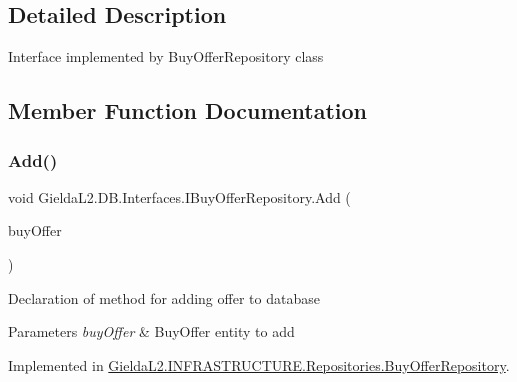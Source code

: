 \subsection{Detailed Description}
Interface implemented by Buy\+Offer\+Repository class 



\subsection{Member Function Documentation}
\mbox{\label{interface_gielda_l2_1_1_d_b_1_1_interfaces_1_1_i_buy_offer_repository_aae66f2818cb5476f701c68266e413d87}} 
\subsubsection{\texorpdfstring{Add()}{Add()}}
{\footnotesize\ttfamily void Gielda\+L2.\+D\+B.\+Interfaces.\+I\+Buy\+Offer\+Repository.\+Add (\begin{DoxyParamCaption}\item[{\mbox{\hyperlink{class_gielda_l2_1_1_d_b_1_1_entities_1_1_buy_offer}{Buy\+Offer}}}]{buy\+Offer }\end{DoxyParamCaption})}



Declaration of method for adding offer to database 


\begin{DoxyParams}{Parameters}
{\em buy\+Offer} & Buy\+Offer entity to add\\
\hline
\end{DoxyParams}


Implemented in \mbox{\hyperlink{class_gielda_l2_1_1_i_n_f_r_a_s_t_r_u_c_t_u_r_e_1_1_repositories_1_1_buy_offer_repository_aeffc5aeab22da20ecaa887219079c5a1}{Gielda\+L2.\+I\+N\+F\+R\+A\+S\+T\+R\+U\+C\+T\+U\+R\+E.\+Repositories.\+Buy\+Offer\+Repository}}.

\mbox{\label{interface_gielda_l2_1_1_d_b_1_1_interfaces_1_1_i_buy_offer_repository_aa086036b9ec0331e455c846193679851}} 
